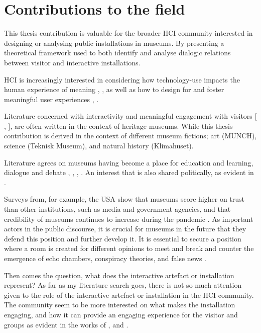 \section{Contributions to the field}

This thesis contribution is valuable for the broader HCI community interested in designing or analysing public installations in museums. By presenting a theoretical framework used to both identify and analyse dialogic relations between visitor and interactive installations. 

HCI is increasingly interested in considering how technology-use impacts the human experience of meaning \autocite{kaptelinin_technology_2018}, \autocite{light_design_2017}, as well as how to design for and foster meaningful user experiences \autocite{grosse-hering_slow_2013}, \autocite{Hassenzahl_Moments_2013}.


Literature concerned with interactivity and meaningful engagement with visitors [ \autocite{mccarthy_place}, \autocite{ciolfi_designing_2012}], are often written in the context of heritage museums. While this thesis contribution is derived in the context of different museum fictions; art (MUNCH), science (Teknisk Museum), and natural history (Klimahuset). 


Literature agrees on museums having become a place for education and learning, dialogue and debate \autocite{narrative_sitzia}, \autocite{hein_1998}, \autocite{hooper_1994}, \autocite{Roberts_1997}. An interest that is also shared politically, as evident in \autocite{melding23}. 

Surveys from, for example, the USA show that museums score higher on trust than other institutions, such as media and government agencies, and that credibility of museums continues to increase during the pandemic \autocite{impact_2020}. As important actors in the public discourse, it is crucial for museums in the future that they defend this position and further develop it. It is essential to secure a position where a room is created for different opinions to meet and break and counter the emergence of echo chambers, conspiracy theories, and false news \autocite[p. 41]{melding23}.


Then comes the question, what does the interactive artefact or installation represent? As far as my literature search goes, there is not so much attention given to the role of the interactive artefact or installation in the HCI community. The community seem to be more interested on what makes the installation engaging, and how it can provide an engaging experience for the visitor and groups as evident in the works of \autocite{hornecker_learning_2006}, and \autocite{ciolfi_designing_2012}.

